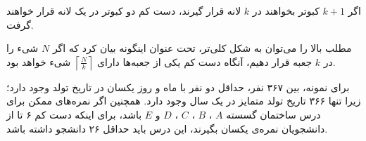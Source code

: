 
\begin{definition}
    اگر 
    $k+1$
    کبوتر  بخواهند در 
    $k$
    لانه قرار گیرند، دست کم دو کبوتر در یک لانه قرار خواهند گرفت.
\end{definition}

\begin{theorem}
    مطلب بالا را می‌توان به شکل کلی‌تر، تحت عنوان
    اینگونه بیان کرد که
    اگر 
    $N$
    شیء را در 
    $k$
    جعبه قرار دهیم، آنگاه دست کم یکی از جعبه‌ها دارای
    $\left \lceil \frac{N}{k} \right \rceil$
    شیء خواهد بود.
\end{theorem}

برای نمونه،
بین ۳۶۷ نفر، حداقل دو نفر با ماه و روز یکسان در تاریخ تولد وجود دارد؛ زیرا تنها ۳۶۶ تاریخ تولد متمایز در یک سال وجود دارد.
همچنین اگر نمره‌های ممکن برای درس ساختمان گسسته 
$A$
، 
$B$
، 
$C$
، 
$D$
و
$E$
باشد، برای اینکه دست کم ۶ تا از دانشجویان نمره‌ی یکسان بگیرند، این درس باید حداقل ۲۶ دانشجو داشته باشد.



